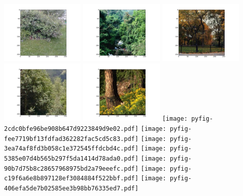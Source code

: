 \documentclass{report}
\begin{document}
\clearpage%
\includegraphics[width=4cm]{dbshow-2-0.png}
\clearpage%
\includegraphics[width=4cm]{dbshow-2-1.png}
\clearpage%
\includegraphics[width=4cm]{dbshow-2-2.png}
\clearpage%
\includegraphics[width=4cm]{dbshow-2-3.png}
\clearpage%
\includegraphics[width=4cm]{dbshow-2-4.png}
\clearpage%
\texttt{[image: pyfig-2cdc0bfe96be908b647d9223849d9e02.pdf]}
\clearpage%
\texttt{[image: pyfig-fee7719bf13fdfad362282fac5cd5c83.pdf]}
\clearpage%
\texttt{[image: pyfig-3ea74af8fd3b058c1e372545ffdcbd4c.pdf]}
\clearpage%
\texttt{[image: pyfig-5385e07d4b565b297f5da1414d78ada0.pdf]}
\clearpage%
\texttt{[image: pyfig-90b7d75b8c28657968975bd2a79eeefc.pdf]}
\clearpage%
\texttt{[image: pyfig-c19f6a6e8b897128ef3084884f522bbf.pdf]}
\clearpage%
\texttt{[image: pyfig-406efa5de7b02585ee3b98bb76335ed7.pdf]}
\clearpage%
\end{document}
